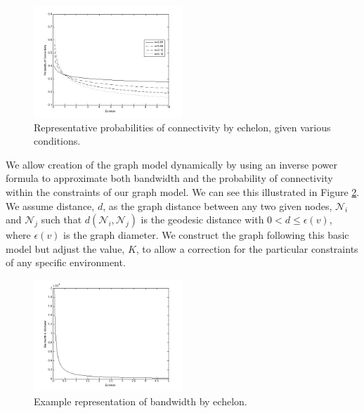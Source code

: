 \documentclass[10pt]{./IEEEtran}
\begin{document}
\begin{figure}[h!]
  \centering
    \includegraphics[width=0.5\textwidth]{images/probcon}
  \caption{Representative probabilities of connectivity by echelon, given various conditions.}
  \label{fig:probcon}
\end{figure}

We allow creation of the graph model dynamically by using an inverse power formula to approximate both bandwidth and the probability of connectivity within the constraints of our graph model.  We can see this illustrated in Figure \ref{fig:bandwidth}.  We assume distance, $d$, as the graph distance between any two given nodes, $\mathscr{N}_i$ and $\mathscr{N}_j$ such that $d(\mathscr{N}_{i}, \mathscr{N}_{j})$ is the geodesic distance with $0<d\leq \epsilon(v)$, where $\epsilon(v)$ is the graph diameter.  We construct the graph following this basic model but adjust the value, $K$, to allow a correction for the particular constraints of any specific environment.

\begin{figure}[h!]
  \centering
    \includegraphics[width=0.5\textwidth]{images/bandwidth}
  \caption{Example representation of bandwidth by echelon.}
  \label{fig:bandwidth}
\end{figure}
\end{document}
